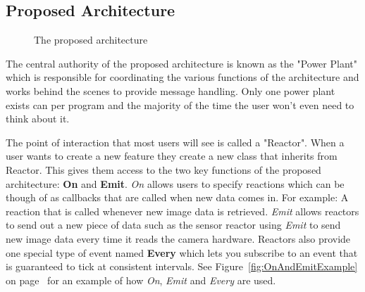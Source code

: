 \documentclass[english,12pt]{scrartcl}
\begin{document}
            
        \subsection{Proposed Architecture}
        
            \begin{figure}[h]
                \centering
                \caption {The proposed architecture} \label{fig:HighLevelProposedArchitecture}
            \end{figure}

            The central authority of the proposed architecture is known as the "Power Plant" which is responsible for coordinating the various functions of the architecture and
            works behind the scenes to provide message handling. Only one power plant exists can per program and the majority of the time the user won't even need to think
            about it. 
            
            The point of interaction that most users will see is called a "Reactor". When a user wants to create a new feature they create a new class that inherits from Reactor. This
            gives them access to the two key functions of the proposed architecture: \textbf{On} and \textbf{Emit}. \emph{On} allows users to specify reactions which can be though
            of as callbacks that are called when new data comes in. For example: A reaction that is called whenever new image data is retrieved. \emph{Emit} allows reactors to
            send out a new piece of data such as the sensor reactor using \emph{Emit} to send new image data every time it reads the camera hardware.
            Reactors also provide one special type of event named \textbf{Every} which lets you subscribe to an event that is guaranteed to tick at consistent intervals. 
            See Figure~\ref{fig:OnAndEmitExample} on page~\pageref{fig:OnAndEmitExample} for an example of how \emph{On}, \emph{Emit} and \emph{Every} are used.
            
\end{document}
